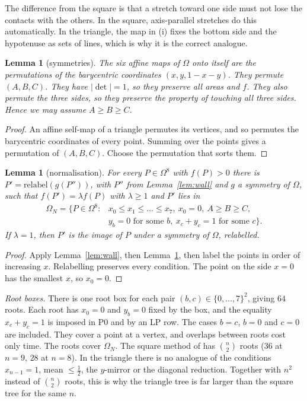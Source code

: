 \documentclass[11pt]{amsart}
\newtheorem{lemma}[theorem]{Lemma}
\theoremstyle{definition}
\newcommand{\Om}{\Omega}
\begin{document}
The difference from the square is that a stretch toward one side must not lose the contacts with the others. In the square, axis-parallel stretches do this automatically. In the triangle, the map in (i) fixes the bottom side and the hypotenuse as sets of lines, which is why it is the correct analogue.

\begin{lemma}[symmetries]\label{lem:s3}
The six affine maps of $\Om$ onto itself are the permutations of the barycentric coordinates $(x, y, 1-x-y)$. They permute $(A, B, C)$. They have $\lvert\det\rvert = 1$, so they preserve all areas and $f$. They also permute the three sides, so they preserve the property of touching all three sides. Hence we may assume $A \ge B \ge C$.
\end{lemma}
\begin{proof}
An affine self-map of a triangle permutes its vertices, and so permutes the barycentric coordinates of every point. Summing over the points gives a permutation of $(A,B,C)$. Choose the permutation that sorts them.
\end{proof}

\begin{lemma}[normalisation]\label{lem:norm}
For every $P \in \Om^8$ with $f(P) > 0$ there is $P' = \mathrm{relabel}(g(P''))$, with $P''$ from Lemma~\ref{lem:wall} and $g$ a symmetry of $\Om$, such that $f(P') = \lambda f(P)$ with $\lambda \ge 1$ and $P'$ lies in
\[
\begin{aligned} \Om_N = \bigl\{ P \in \Om^8 :{} &x_0 \le x_1 \le \dots \le x_7,\ x_0 = 0,\ A \ge B \ge C,\\ &y_b = 0 \text{ for some } b,\ x_c + y_c = 1 \text{ for some } c \bigr\}. \end{aligned}
\]
If $\lambda = 1$, then $P'$ is the image of $P$ under a symmetry of $\Om$, relabelled.
\end{lemma}
\begin{proof}
Apply Lemma~\ref{lem:wall}, then Lemma~\ref{lem:s3}, then label the points in order of increasing $x$. Relabelling preserves every condition. The point on the side $x = 0$ has the smallest $x$, so $x_0 = 0$.
\end{proof}

\emph{Root boxes.} There is one root box for each pair $(b,c) \in \{0,\dots,7\}^2$, giving $64$ roots. Each root has $x_0 = 0$ and $y_b = 0$ fixed by the box, and the equality $x_c + y_c = 1$ is imposed in P0 and by an LP row. The cases $b = c$, $b = 0$ and $c = 0$ are included. They cover a point at a vertex, and overlaps between roots cost only time. The roots cover $\Om_N$. %
The square method of \cite{N9} has $\binom n2$ roots ($36$ at $n = 9$, $28$ at $n = 8$). In the triangle there is no analogue of the conditions $x_{n-1} = 1$, mean $\le \frac12$, the $y$-mirror or the diagonal reduction. Together with $n^2$ instead of $\binom n2$ roots, this is why the triangle tree is far larger than the square tree for the same $n$. %
\end{document}
